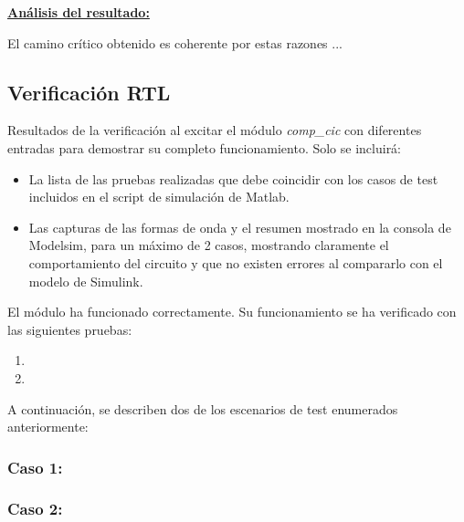 \documentclass[parskip,a4paper,12pt]{article}
\begin{document}
\underline{\textbf{Análisis del resultado:}}

El camino crítico obtenido es coherente por estas razones ...


\subsection{Verificación RTL}
\begin{enunciado}{}{}%
Resultados de la verificación al excitar el módulo \emph{comp\_cic} con diferentes entradas para demostrar su completo funcionamiento. Solo se incluirá:
\begin{itemize}
\item La lista de las pruebas realizadas que debe coincidir con los casos de test incluidos en el script de simulación de Matlab.
\item Las capturas de las formas de onda y el resumen mostrado en la consola de Modelsim, para un máximo de 2 casos, mostrando claramente el comportamiento del circuito y que no existen errores al compararlo con el modelo de Simulink.  
\end{itemize}
\end{enunciado}

El módulo ha funcionado correctamente. Su funcionamiento se ha verificado con las siguientes pruebas:
\begin{enumerate}
    \item 
    \item 
\end{enumerate}

A continuación, se describen dos de los escenarios de test enumerados anteriormente:
\subsubsection{Caso 1: }



\subsubsection{Caso 2:}
%
\end{document}
